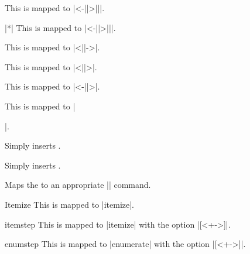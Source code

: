 \begin{command}{\untilSlide{}}
  This is mapped to |\uncover<-||>{||}|.
\end{command}

\begin{command}{\untilsSlide|*|}
  This is mapped to |\only<-||>{||}|.
\end{command}

\begin{command}{\FromSlide{}}
  This is mapped to |\onslide<||->|.
\end{command}

\begin{command}{\OnlySlide{}}
  This is mapped to |\onslide<||>|.
\end{command}

\begin{command}{\UntilSlide{}}
  This is mapped to |\onslide<-||>|.
\end{command}

\begin{command}{\slideCaption{}}
  This is mapped to |\date{||}|.
\end{command}

\begin{command}{\fontTitle{}}
  Simply inserts .
\end{command}

\begin{command}{\fontText{}}
  Simply inserts .
\end{command}

\begin{command}{\PDFtransition{}}
  Maps the  to an appropriate |\transxxxx| command.
\end{command}

\begin{environment}{{Itemize}}
  This is mapped to |itemize|.
\end{environment}

\begin{environment}{{itemstep}}
  This is mapped to |itemize| with the option |[<+->]|.
\end{environment}

\begin{environment}{{enumstep}}
  This is mapped to |enumerate| with the option |[<+->]|.
\end{environment}

